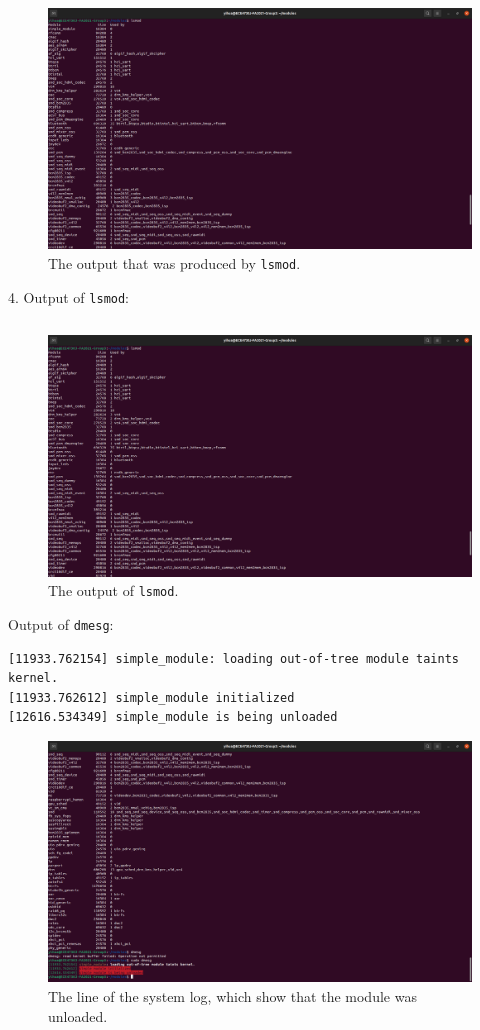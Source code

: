 \documentclass[a4paper]{article}
\begin{document}
\begin{figure}[H]
    \centering
    \includegraphics[width=1\textwidth]{3.png}
    \caption{The output that was produced by \texttt{lsmod}.}
\end{figure}
4. Output of \texttt{lsmod}:
\inputminted[frame=single,bgcolor=bg,breaklines,breakanywhere,linenos]{text}{Lab4-4.txt}
\begin{figure}[H]
    \centering
    \includegraphics[width=1\textwidth]{4.png}
    \caption{The output of \texttt{lsmod}.}
\end{figure}
Output of \texttt{dmesg}:
\begin{verbatim}
[11933.762154] simple_module: loading out-of-tree module taints kernel.
[11933.762612] simple_module initialized
[12616.534349] simple_module is being unloaded
\end{verbatim}
\begin{figure}[H]
    \centering
    \includegraphics[width=1\textwidth]{5.png}
    \caption{The line of the system log, which show that the module was unloaded.}
\end{figure}
\end{document}
